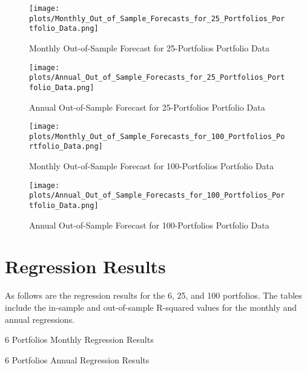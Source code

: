 \documentclass[12pt]{article}
\begin{document}
\begin{figure}[h]
    \centering
    \texttt{[image: plots/Monthly\_Out\_of\_Sample\_Forecasts\_for\_25\_Portfolios\_Portfolio\_Data.png]}
    \caption{Monthly Out-of-Sample Forecast for 25-Portfolios Portfolio Data}
    \label{fig:forecast_25_monthly}
\end{figure}

\begin{figure}[h]
    \centering
    \texttt{[image: plots/Annual\_Out\_of\_Sample\_Forecasts\_for\_25\_Portfolios\_Portfolio\_Data.png]}
    \caption{Annual Out-of-Sample Forecast for 25-Portfolios Portfolio Data}
    \label{fig:forecast_25_annual}
\end{figure}

\begin{figure}[h]
    \centering
    \texttt{[image: plots/Monthly\_Out\_of\_Sample\_Forecasts\_for\_100\_Portfolios\_Portfolio\_Data.png]}
    \caption{Monthly Out-of-Sample Forecast for 100-Portfolios Portfolio Data}
    \label{fig:forecast_100_monthly}
\end{figure}

\begin{figure}[h]
    \centering
    \texttt{[image: plots/Annual\_Out\_of\_Sample\_Forecasts\_for\_100\_Portfolios\_Portfolio\_Data.png]}
    \caption{Annual Out-of-Sample Forecast for 100-Portfolios Portfolio Data}
    \label{fig:forecast_100_annual}
\end{figure}


\doublespacing
\section{Regression Results}

As follows are the regression results for the 6, 25, and 100 portfolios. The tables include the in-sample and 
out-of-sample R-squared values for the monthly and annual regressions.

\begin{table}[ht]
    \centering
    \caption{6 Portfolios Monthly Regression Results}
    
\end{table}

\begin{table}[ht]
    \centering
    \caption{6 Portfolios Annual Regression Results}
    
\end{table}
\end{document}
